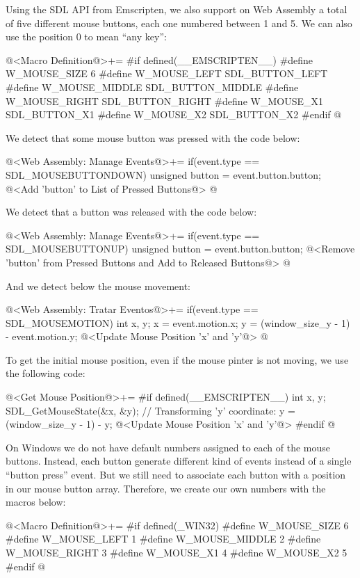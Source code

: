 Using the SDL API from Emscripten, we also support on Web Assembly a
total of five different mouse buttons, each one numbered between 1 and
5. We can also use the position 0 to mean ``any key'':

\iniciocodigo
@<Macro Definition@>+=
#if defined(__EMSCRIPTEN__)
#define W_MOUSE_SIZE 6
#define W_MOUSE_LEFT   SDL_BUTTON_LEFT
#define W_MOUSE_MIDDLE SDL_BUTTON_MIDDLE
#define W_MOUSE_RIGHT  SDL_BUTTON_RIGHT
#define W_MOUSE_X1     SDL_BUTTON_X1
#define W_MOUSE_X2     SDL_BUTTON_X2
#endif
@
\fimcodigo

We detect that some mouse button was pressed with the code below:

\iniciocodigo
@<Web Assembly: Manage Events@>+=
if(event.type == SDL_MOUSEBUTTONDOWN){
  unsigned button = event.button.button;
  @<Add 'button' to List of Pressed Buttons@>
}
@
\fimcodigo

We detect that a button was released with the code below:

\iniciocodigo
@<Web Assembly: Manage Events@>+=
if(event.type == SDL_MOUSEBUTTONUP){
  unsigned button = event.button.button;
  @<Remove 'button' from Pressed Buttons and Add to Released Buttons@>
}
@
\fimcodigo

And we detect below the mouse movement:

\iniciocodigo
@<Web Assembly: Tratar Eventos@>+=
if(event.type == SDL_MOUSEMOTION){
  int x, y;
  x = event.motion.x;
  y = (window_size_y - 1) - event.motion.y;
  @<Update Mouse Position 'x' and 'y'@>
}
@
\fimcodigo

To get the initial mouse position, even if the mouse pinter is not
moving, we use the following code:

\iniciocodigo
@<Get Mouse Position@>+=
#if defined(__EMSCRIPTEN__)
{
  int x, y;
  SDL_GetMouseState(&x, &y);
  // Transforming 'y' coordinate:
  y = (window_size_y - 1) - y;
  @<Update Mouse Position 'x' and 'y'@>
}
#endif
@
\fimcodigo



On Windows we do not have default numbers assigned to each of the mouse
buttons. Instead, each button generate different kind of events
instead of a single ``button press'' event. But we still need to
associate each button with a position in our mouse button
array. Therefore, we create our own numbers with the macros below:

\iniciocodigo
@<Macro Definition@>+=
#if defined(_WIN32)
#define W_MOUSE_SIZE 6
#define W_MOUSE_LEFT   1
#define W_MOUSE_MIDDLE 2
#define W_MOUSE_RIGHT  3
#define W_MOUSE_X1     4
#define W_MOUSE_X2     5
#endif
@
\fimcodigo

